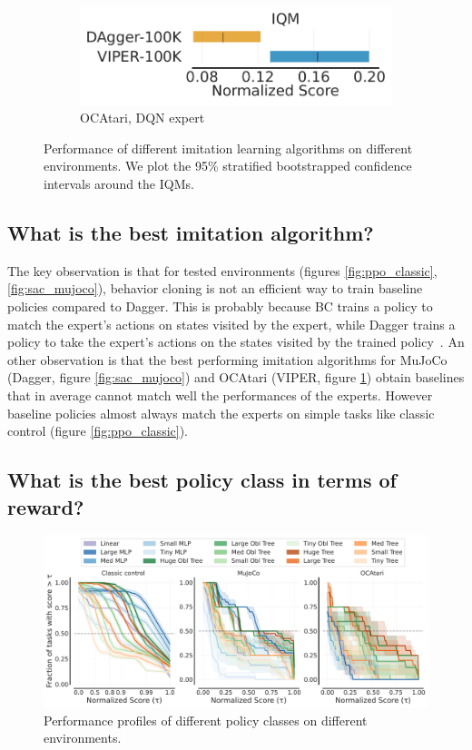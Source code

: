 \begin{figure}[ht]
\begin{subfigure}{.33\textwidth}
  \centering
  \includegraphics[width=\linewidth]{images/images_part3/dqn_expert_atari.pdf}
  \caption{OCAtari, DQN expert}
  \label{fig:dqn_atari}
\end{subfigure}%
\caption{Performance of different imitation learning algorithms on different environments. We plot the 95\% stratified bootstrapped confidence intervals around the IQMs.}
\label{fig:performance_comparison}
\end{figure}

\subsection{What is the best imitation algorithm?}

The key observation is that for tested environments (figures \ref{fig:ppo_classic},\ref{fig:sac_mujoco}), behavior cloning is not an efficient way to train baseline policies compared to Dagger.
This is probably because BC trains a policy to match the expert's actions on states visited by the expert, while Dagger trains a policy to take the expert's actions on the states visited by the trained policy~\cite{dagger}.
An other observation is that the best performing imitation algorithms for MuJoCo (Dagger, figure \ref{fig:sac_mujoco}) and OCAtari (VIPER, figure \ref{fig:dqn_atari}) obtain baselines that in average cannot match well the performances of the experts.
However baseline policies almost always match the experts on simple tasks like classic control (figure \ref{fig:ppo_classic}).

\subsection{What is the best policy class in terms of reward?}

\begin{figure}[ht]
    \centering
    \includegraphics[trim={0 0 0 0.2cm},clip,width=0.9\linewidth]{images/images_part3/perf_profile_combined_100k.pdf}
    \caption{Performance profiles of different policy classes on different environments.}
    \label{fig:perf-combined}
\end{figure}

